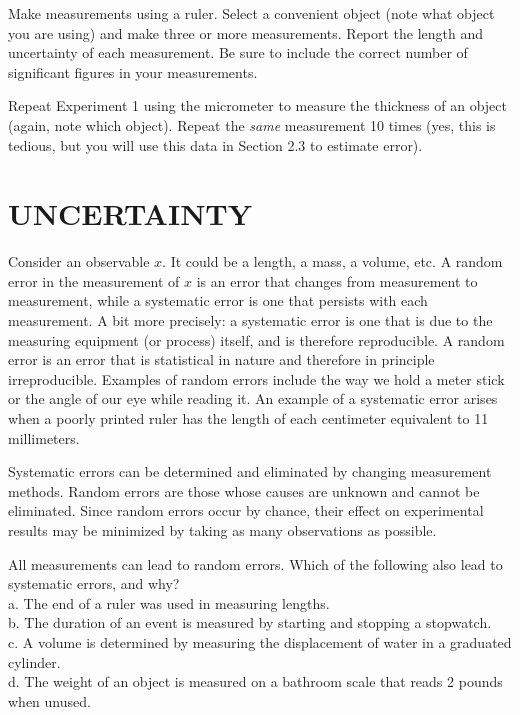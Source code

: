 \documentclass[11pt,letterpaper]{article}
\newcounter{question}[section]
\begin{document}
\clearpage
\question{} Make measurements using a ruler. Select a convenient object (note what object you are using) and make three or more measurements. Report the length and uncertainty of each measurement. Be sure to include the correct number of significant figures in your measurements.
\vspace{6cm}


\question{} Repeat Experiment 1 using the micrometer to measure the thickness of an object (again, note which object). Repeat the \textit{same} measurement 10 times (yes, this is tedious, but you will use this data in Section 2.3 to estimate error).



\section{UNCERTAINTY}
Consider an observable $x$. It could be a length, a mass, a volume, etc. A random error in the measurement of $x$
is an error that changes from measurement to measurement, while a
systematic error is one that persists with each measurement.  A bit
more precisely:  a systematic error is one that is due to the
measuring equipment (or process) itself, and is therefore
reproducible.  A random error is an error that is
statistical in nature and therefore in principle irreproducible.
Examples of random errors include the way we hold a meter stick or the
angle of our eye while reading it.  An example of a systematic error
arises when a poorly printed ruler has the length of each centimeter
equivalent to 11 millimeters.

Systematic errors can be determined and eliminated by changing measurement methods.  Random errors are those whose causes are unknown and cannot be eliminated.  Since random errors occur by chance, their effect on experimental results may be minimized by taking as many observations as possible.

\question{} All measurements can lead to random errors. Which of the following also lead to systematic errors, and why?\\
a. The end of a ruler was used in measuring lengths.\\
b. The duration of an event is measured by starting and stopping a stopwatch.\\
c. A volume is determined by measuring the displacement of water in a
graduated cylinder.\\
d. The weight of an object is measured on a bathroom scale that reads 2 pounds when unused.\\
\vspace{6cm}
\end{document}
